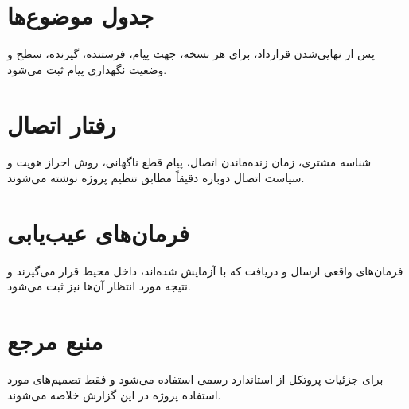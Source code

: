 \section{جدول موضوع‌ها}
پس از نهایی‌شدن قرارداد، برای هر
نسخه، جهت پیام، فرستنده، گیرنده، سطح
و وضعیت نگهداری پیام ثبت می‌شود.

\section{رفتار اتصال}
شناسه مشتری، زمان زنده‌ماندن اتصال، پیام قطع ناگهانی، روش احراز هویت و سیاست اتصال دوباره دقیقاً مطابق تنظیم پروژه نوشته می‌شوند.

\section{فرمان‌های عیب‌یابی}
فرمان‌های واقعی ارسال و دریافت که با
آزمایش شده‌اند، داخل محیط
قرار می‌گیرند و نتیجه مورد انتظار آن‌ها نیز ثبت می‌شود.

\section{منبع مرجع}
برای جزئیات پروتکل از استاندارد رسمی
استفاده می‌شود و فقط تصمیم‌های مورد استفاده پروژه در این گزارش خلاصه می‌شوند.
